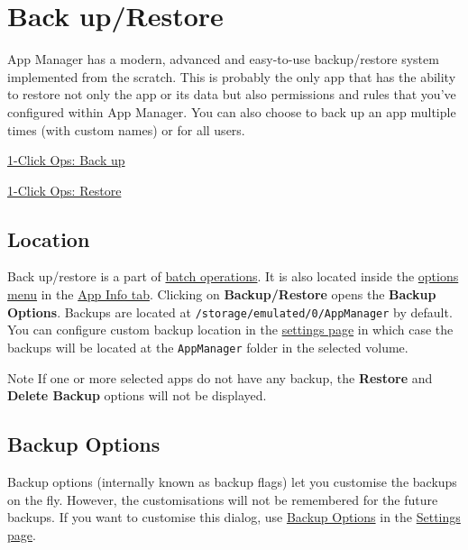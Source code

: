 \section{Back up/Restore}\label{sec:backup-restore}
App Manager has a modern, advanced and easy-to-use backup/restore system implemented from the scratch.
This is probably the only app that has the ability to restore not only the app or its data but also permissions and
rules that you've configured within App Manager.
You can also choose to back up an app multiple times (with custom names) or for all users.

\begin{amseealso}
    \item \hyperref[subsec:1-click-back-up]{1-Click Ops: Back up}
    \item \hyperref[subsec:1-click-restore]{1-Click Ops: Restore}
\end{amseealso}

\subsection{Location}\label{subsec:backup-location}
Back up/restore is a part of \hyperref[subsec:batch-operations]{batch operations}.
It is also located inside the \hyperref[subsubsec:app-info-options-menu]{options menu} in the
\hyperref[subsec:app-info-tab]{App Info tab}.
Clicking on \textbf{Backup/Restore} opens the \textbf{Backup Options}.
Backups are located at \texttt{/storage/emulated/0/AppManager} by default.
You can configure custom backup location in the \hyperref[subsubsec:backup-volume]{settings page} in which case the backups
will be located at the \texttt{AppManager} folder in the selected volume.

\begin{tip}{Note}
    If one or more selected apps do not have any backup, the \textbf{Restore} and \textbf{Delete Backup} options will
    not be displayed.
\end{tip}

\subsection{Backup Options}\label{subsec:backup-restore-backup-options}
Backup options (internally known as backup flags) let you customise the backups on the fly.
However, the customisations will not be remembered for the future backups.
If you want to customise this dialog, use \hyperref[subsubsec:settings-backup-options]{Backup Options} in the \hyperref[sec:settings-page]{Settings page}.

